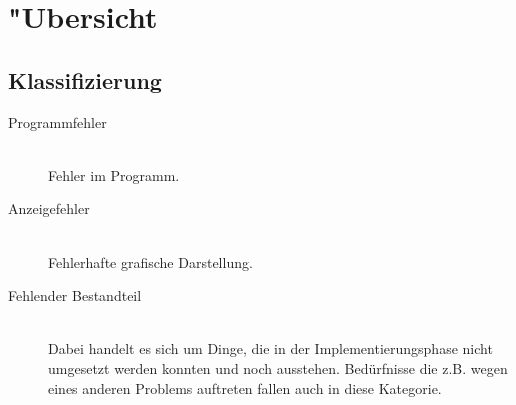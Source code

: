 %



\section{{"U}bersicht}
\label{Kapitel:Programmfehler:Uebersicht}








\subsection{Klassifizierung}
\label{Abschnitt:Programmfehler:Uebersicht:Klassifizierung}


\begin{description}

	\item[Programmfehler] ~\hfill\\
	
	Fehler im Programm.\\
	
	\item[Anzeigefehler] ~\hfill\\
	
	Fehlerhafte grafische Darstellung.\\
	
	\item[Fehlender Bestandteil] ~\hfill\\
	
	Dabei handelt es sich um Dinge, die in der Implementierungsphase nicht umgesetzt werden konnten und noch ausstehen. Bedürfnisse die z.B. wegen eines anderen Problems auftreten fallen auch in diese Kategorie.\\
	

\end{description}


